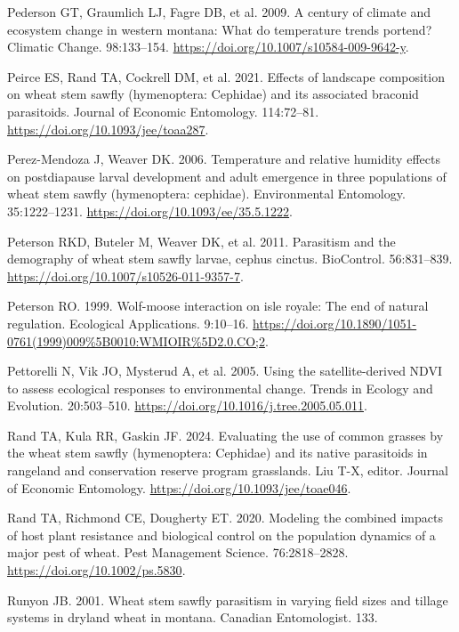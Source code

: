 \documentclass[
]{article}
\newlength{\cslhangindent}
\newenvironment{CSLReferences}[2] %
 {\begin{list}{}{%
  \setlength{\itemindent}{0pt}
  \setlength{\leftmargin}{0pt}
  \setlength{\parsep}{0pt}
  \ifodd #1
   \setlength{\leftmargin}{\cslhangindent}
   \setlength{\itemindent}{-1\cslhangindent}
  \fi
  \setlength{\itemsep}{#2\baselineskip}}}
 {\end{list}}
\begin{document}
\begin{CSLReferences}{0}{1}
Pederson GT, Graumlich LJ, Fagre DB, et al. 2009. A century of climate
and ecosystem change in western montana: What do temperature trends
portend? Climatic Change. 98:133--154.
\url{https://doi.org/10.1007/s10584-009-9642-y}.

Peirce ES, Rand TA, Cockrell DM, et al. 2021. Effects of landscape
composition on wheat stem sawfly (hymenoptera: Cephidae) and its
associated braconid parasitoids. Journal of Economic Entomology.
114:72--81. \url{https://doi.org/10.1093/jee/toaa287}.

Perez-Mendoza J, Weaver DK. 2006. Temperature and relative humidity
effects on postdiapause larval development and adult emergence in three
populations of wheat stem sawfly (hymenoptera: cephidae). Environmental
Entomology. 35:1222--1231. \url{https://doi.org/10.1093/ee/35.5.1222}.

Peterson RKD, Buteler M, Weaver DK, et al. 2011. Parasitism and the
demography of wheat stem sawfly larvae, cephus cinctus. BioControl.
56:831--839. \url{https://doi.org/10.1007/s10526-011-9357-7}.

Peterson RO. 1999. Wolf-moose interaction on isle royale: The end of
natural regulation. Ecological Applications. 9:10--16.
\url{https://doi.org/10.1890/1051-0761(1999)009\%5B0010:WMIOIR\%5D2.0.CO;2}.

Pettorelli N, Vik JO, Mysterud A, et al. 2005. Using the
satellite-derived NDVI to assess ecological responses to environmental
change. Trends in Ecology and Evolution. 20:503--510.
\url{https://doi.org/10.1016/j.tree.2005.05.011}.

Rand TA, Kula RR, Gaskin JF. 2024. Evaluating the use of common grasses
by the wheat stem sawfly (hymenoptera: Cephidae) and its native
parasitoids in rangeland and conservation reserve program grasslands.
Liu T-X, editor. Journal of Economic Entomology.
\url{https://doi.org/10.1093/jee/toae046}.

Rand TA, Richmond CE, Dougherty ET. 2020. Modeling the combined impacts
of host plant resistance and biological control on the population
dynamics of a major pest of wheat. Pest Management Science.
76:2818--2828. \url{https://doi.org/10.1002/ps.5830}.

Runyon JB. 2001. Wheat stem sawfly parasitism in varying field sizes and
tillage systems in dryland wheat in montana. Canadian Entomologist. 133.


\end{CSLReferences}
\end{document}
